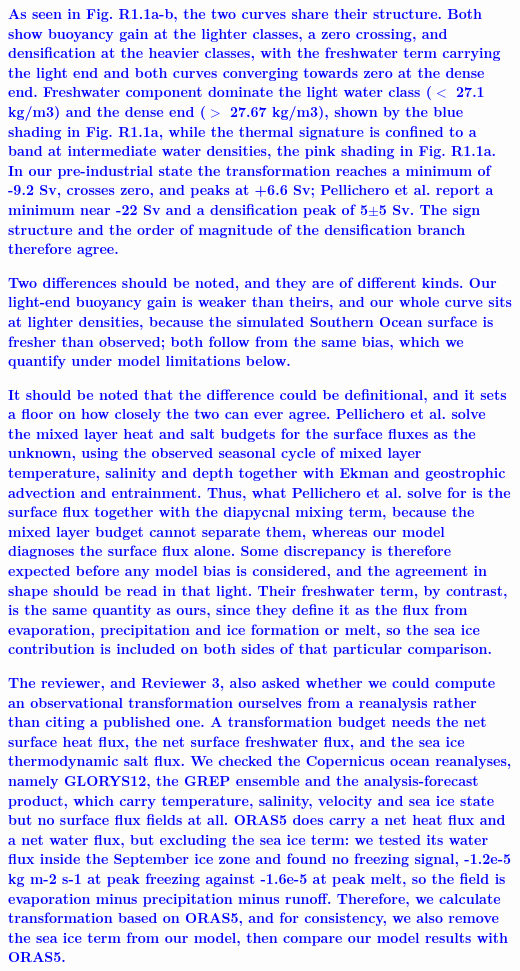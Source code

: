 \documentclass[pdflatex,sn-nature]{sn-jnl}
\begin{document}
\noindent\textcolor{blue}{\textbf{As seen in Fig. R1.1a-b, the two curves share their structure. Both show buoyancy gain at the lighter classes, a zero crossing, and densification at the heavier classes, with the freshwater term carrying the light end and both curves converging towards zero at the dense end. Freshwater component dominate the light water class ($<$ 27.1 kg/m3) and the dense end ($>$ 27.67 kg/m3), shown by the blue shading in Fig. R1.1a, while the thermal signature is confined to a band at intermediate water densities, the pink shading in Fig. R1.1a. In our pre-industrial state the transformation reaches a minimum of -9.2 Sv, crosses zero, and peaks at +6.6 Sv; Pellichero et al. report a minimum near -22 Sv and a densification peak of 5$\pm$5 Sv. The sign structure and the order of magnitude of the densification branch therefore agree.}}


\noindent\textcolor{blue}{\textbf{Two differences should be noted, and they are of different kinds. Our light-end buoyancy gain is weaker than theirs, and our whole curve sits at lighter densities, because the simulated Southern Ocean surface is fresher than observed; both follow from the same bias, which we quantify under model limitations below.}}


\noindent\textcolor{blue}{\textbf{It should be noted that the difference could be definitional, and it sets a floor on how closely the two can ever agree. Pellichero et al. solve the mixed layer heat and salt budgets for the surface fluxes as the unknown, using the observed seasonal cycle of mixed layer temperature, salinity and depth together with Ekman and geostrophic advection and entrainment. Thus, what Pellichero et al. solve for is the surface flux together with the diapycnal mixing term, because the mixed layer budget cannot separate them, whereas our model diagnoses the surface flux alone. Some discrepancy is therefore expected before any model bias is considered, and the agreement in shape should be read in that light. Their freshwater term, by contrast, is the same quantity as ours, since they define it as the flux from evaporation, precipitation and ice formation or melt, so the sea ice contribution is included on both sides of that particular comparison.}}


\noindent\textcolor{blue}{\textbf{The reviewer, and Reviewer 3, also asked whether we could compute an observational transformation ourselves from a reanalysis rather than citing a published one. A transformation budget needs the net surface heat flux, the net surface freshwater flux, and the sea ice thermodynamic salt flux. We checked the Copernicus ocean reanalyses, namely GLORYS12, the GREP ensemble and the analysis-forecast product, which carry temperature, salinity, velocity and sea ice state but no surface flux fields at all. ORAS5 does carry a net heat flux and a net water flux, but excluding the sea ice term: we tested its water flux inside the September ice zone and found no freezing signal, -1.2e-5 kg m-2 s-1 at peak freezing against -1.6e-5 at peak melt, so the field is evaporation minus precipitation minus runoff. Therefore, we calculate transformation based on ORAS5, and for consistency, we also remove the sea ice term from our model, then compare our model results with ORAS5.}}
\end{document}
